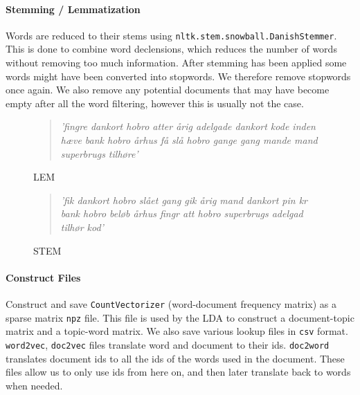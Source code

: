 \paragraph{Stemming / Lemmatization}
Words are reduced to their stems using \texttt{nltk.stem.snowball.DanishStemmer}. 
This is done to combine word declensions, which reduces the number of words without removing too much information.
After stemming has been applied some words might have been converted into stopwords. We therefore remove stopwords once again.
We also remove any potential documents that may have become empty after all the word filtering, however this is usually not the case.
\begin{figure}[h]
	\begin{quote}
		\textit{
			'fingre dankort hobro atter årig adelgade dankort kode inden hæve bank hobro århus få slå hobro gange gang mande mand superbrugs tilhøre'
		}
	\end{quote}
	\caption{LEM}
	\label{prepro:example5}
\end{figure}
\begin{figure}[h]
	\begin{quote}
		\textit{
			'fik dankort hobro slået gang gik årig mand dankort pin kr bank hobro beløb århus fingr att hobro superbrugs adelgad tilhør kod'
		}
	\end{quote}
	\caption{STEM}
	\label{prepro:example6}
\end{figure}

\paragraph{Construct Files}
Construct and save \texttt{CountVectorizer} (word-document frequency matrix) as a sparse matrix \texttt{npz} file. This file is used by the LDA to construct a document-topic matrix and a topic-word matrix.
We also save various lookup files in \texttt{csv} format. \texttt{word2vec}, \texttt{doc2vec} files translate word and document to their ids.
\texttt{doc2word} translates document ids to all the ids of the words used in the document.
These files allow us to only use ids from here on, and then later translate back to words when needed.


